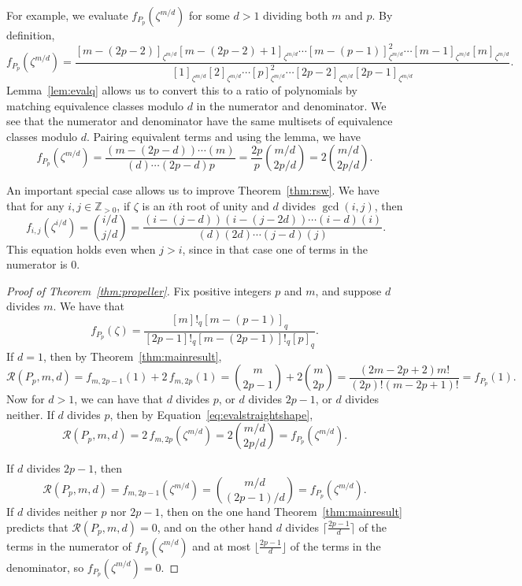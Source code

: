 \documentclass[12pt]{amsart}
\theoremstyle{definition}
\theoremstyle{remark}
\numberwithin{equation}{section}
\begin{document}
For example, we evaluate $f_{P_p}(\zeta^{m/d})$ for some $d > 1$ dividing both $m$ and $p$. By definition,
\[ f_{P_p}(\zeta^{m/d}) = \frac{[m-(2p-2)]_{\zeta^{m/d}}[m-(2p-2)+1]_{\zeta^{m/d}} \cdots [m-(p-1)]_{\zeta^{m/d}}^2 \cdots [m-1]_{\zeta^{m/d}}[m]_{\zeta^{m/d}}}{[1]_{\zeta^{m/d}}[2]_{\zeta^{m/d}} \cdots [p]_{\zeta^{m/d}}^2 \cdots [2p-2]_{\zeta^{m/d}}[2p-1]_{\zeta^{m/d}}}.\]
Lemma~\ref{lem:evalq} allows us to convert this to a ratio of polynomials by matching equivalence classes modulo $d$ in the numerator and denominator. We see that the numerator and denominator have the same multisets of equivalence classes modulo $d$. Pairing equivalent terms and using the lemma, we have
\[ f_{P_p}(\zeta^{m/d}) = \frac{(m-(2p-d)) \cdots  (m)}{(d) \cdots  (2p-d) p} = \frac{2p}{p}  \binom{m/d}{2p/d} = 2 \binom{m/d}{2p/d}.\]     

An important special case allows us to improve Theorem~\ref{thm:rsw}. We have that for any $i, j \in \mathbb{Z}_{> 0}$, if $\zeta$ is an $i$th root of unity and $d$ divides $\gcd(i,j)$, then
\begin{equation}~\label{eq:evalstraightshape}
f_{i,j}(\zeta^{i/d}) = \binom{i/d}{j/d} = \frac{(i-(j-d))(i-(j-2d)) \cdots  (i-d)(i)}{(d)  (2d)  \cdots  (j-d) (j)}. 
\end{equation}
This equation holds even when $j > i$, since in that case one of terms in the numerator is $0$. 



\begin{proof}[Proof of Theorem~\ref{thm:propeller}] Fix positive integers $p$ and $m$, and suppose $d$ divides $m$. We have that \[ f_{P_p}(\zeta) = \frac{[m]!_q [m-(p-1)]_q}{[2p-1]!_q [m-(2p-1)]!_q [p]_q }.\]  If $d = 1$, then by Theorem~\ref{thm:mainresult}, 
\[ \mathcal{R}(P_p,m,d) = f_{m,2p-1}(1) + 2 \, f_{m,2p}(1) = \binom{m}{2p-1} + 2 \binom{m}{2p} = \frac{(2m-2p+2)m!}{(2p)!(m-2p+1)!} = f_{P_p}(1). \]
Now for $d > 1$, we can have that $d$ divides $p$, or $d$ divides $2p-1$, or $d$ divides neither. If $d$ divides $p$, then by Equation~\ref{eq:evalstraightshape},
\[ \mathcal{R}(P_p,m,d) = 2 \, f_{m,2p}(\zeta^{m/d}) = 2\binom{m/d}{2p/d} = f_{P_p}(\zeta^{m/d}).\]

If $d$ divides $2p-1$,  then
\[ \mathcal{R}(P_p,m,d) =  f_{m,2p-1}(\zeta^{m/d}) = \binom{m/d}{(2p-1)/d} = f_{P_p}(\zeta^{m/d}).\]
If $d$ divides neither $p$ nor $2p-1$, then on the one hand Theorem~\ref{thm:mainresult} predicts that $\mathcal{R}(P_p,m,d) = 0$, and on the other hand $d$ divides $\lceil{\frac{2p-1}{d}}\rceil$ of the terms in the numerator of $f_{P_p}(\zeta^{m/d})$ and at most $\lfloor{\frac{2p-1}{d}}\rfloor$ of the terms in the denominator, so $f_{P_p}(\zeta^{m/d}) = 0$. 
\end{proof}
\end{document}
